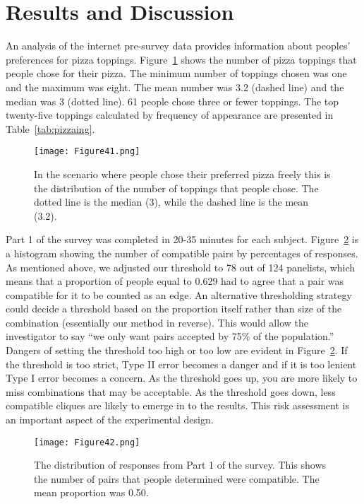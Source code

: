 \section{Results and Discussion}
An analysis of the internet pre-survey data provides information about peoples’ preferences for pizza toppings.  Figure~\ref{fig:pizztoppings} shows the number of pizza toppings that people chose for their pizza.  The minimum number of toppings chosen was one and the maximum was eight.  The mean number was 3.2 (dashed line) and the median was 3 (dotted line).  61 people chose three or fewer toppings.  The top twenty-five toppings calculated by frequency of appearance are presented in Table~\ref{tab:pizzaing}.

\begin{figure}[h!]
\caption[The number of toppings people chose in free-choice portion of experiment.]{In the scenario where people chose their preferred pizza freely this is the distribution of  the number of toppings that people chose.  The dotted line is the median (3), while the dashed line is the mean (3.2).}
\label{fig:pizztoppings}
\centering
\texttt{[image: Figure41.png]}
\end{figure}

Part 1 of the survey was completed in 20-35 minutes for each subject.  Figure~\ref{fig:pizzsize} is a histogram showing the number of compatible pairs by percentages of responses.  As mentioned above, we adjusted our threshold to 78 out of 124 panelists, which means that a proportion of people equal to 0.629 had to agree that a pair was compatible for it to be counted as an edge.  An alternative thresholding strategy could decide a threshold based on the proportion itself rather than size of the combination (essentially our method in reverse).  This would allow the investigator to say “we only want pairs accepted by 75\% of the population.”  Dangers of setting the threshold too high or too low are evident in Figure~\ref{fig:pizzsize}.  If the threshold is too strict, Type II error becomes a danger and if it is too lenient Type I error becomes a concern.  As the threshold goes up, you are more likely to miss combinations that may be acceptable.  As the threshold goes down, less compatible cliques are likely to emerge in to the results.  This risk assessment is an important aspect of the experimental design.

\begin{figure}[h!]
\caption[The distribution of responses from Part 1 of the survey.]{The distribution of responses from  Part 1 of the survey.  This shows the number of pairs that people determined were compatible.  The mean proportion was 0.50.}
\label{fig:pizzsize}
\centering
\texttt{[image: Figure42.png]}
\end{figure}

